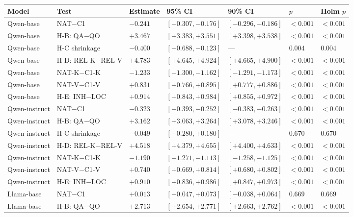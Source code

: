 \begin{table}[p]
\centering\scriptsize
\begin{adjustbox}{max width=\linewidth}\begin{tabular}{@{}l l l l l l l@{}}
\toprule
Model & Test & Estimate & 95\% CI & 90\% CI & $p$ & Holm $p$ \\
\midrule
Qwen-base & NAT$-$C1 & $-0.241$ & $[-0.307, -0.176]$ & $[-0.296, -0.186]$ & $<0.001$ & $<0.001$ \\
Qwen-base & H-B: QA$-$QO & $+3.467$ & $[+3.383, +3.551]$ & $[+3.398, +3.538]$ & $<0.001$ & $<0.001$ \\
Qwen-base & H-C shrinkage & $-0.400$ & $[-0.688, -0.123]$ & --- & $0.004$ & $0.004$ \\
Qwen-base & H-D: REL-K$-$REL-V & $+4.783$ & $[+4.645, +4.924]$ & $[+4.665, +4.900]$ & $<0.001$ & $<0.001$ \\
Qwen-base & NAT-K$-$C1-K & $-1.233$ & $[-1.300, -1.162]$ & $[-1.291, -1.173]$ & $<0.001$ & $<0.001$ \\
Qwen-base & NAT-V$-$C1-V & $+0.831$ & $[+0.766, +0.895]$ & $[+0.777, +0.886]$ & $<0.001$ & $<0.001$ \\
Qwen-base & H-E: INH$-$LOC & $+0.914$ & $[+0.843, +0.984]$ & $[+0.855, +0.972]$ & $<0.001$ & $<0.001$ \\
\midrule
Qwen-instruct & NAT$-$C1 & $-0.323$ & $[-0.393, -0.252]$ & $[-0.383, -0.263]$ & $<0.001$ & $<0.001$ \\
Qwen-instruct & H-B: QA$-$QO & $+3.162$ & $[+3.063, +3.264]$ & $[+3.078, +3.246]$ & $<0.001$ & $<0.001$ \\
Qwen-instruct & H-C shrinkage & $-0.049$ & $[-0.280, +0.180]$ & --- & $0.670$ & $0.670$ \\
Qwen-instruct & H-D: REL-K$-$REL-V & $+4.518$ & $[+4.379, +4.655]$ & $[+4.400, +4.633]$ & $<0.001$ & $<0.001$ \\
Qwen-instruct & NAT-K$-$C1-K & $-1.190$ & $[-1.271, -1.113]$ & $[-1.258, -1.125]$ & $<0.001$ & $<0.001$ \\
Qwen-instruct & NAT-V$-$C1-V & $+0.740$ & $[+0.669, +0.814]$ & $[+0.680, +0.802]$ & $<0.001$ & $<0.001$ \\
Qwen-instruct & H-E: INH$-$LOC & $+0.910$ & $[+0.836, +0.986]$ & $[+0.847, +0.973]$ & $<0.001$ & $<0.001$ \\
\midrule
Llama-base & NAT$-$C1 & $+0.013$ & $[-0.047, +0.073]$ & $[-0.038, +0.064]$ & $0.669$ & $0.669$ \\
Llama-base & H-B: QA$-$QO & $+2.713$ & $[+2.654, +2.771]$ & $[+2.663, +2.762]$ & $<0.001$ & $<0.001$ \\

\end{tabular}
\end{adjustbox}
\end{table}
